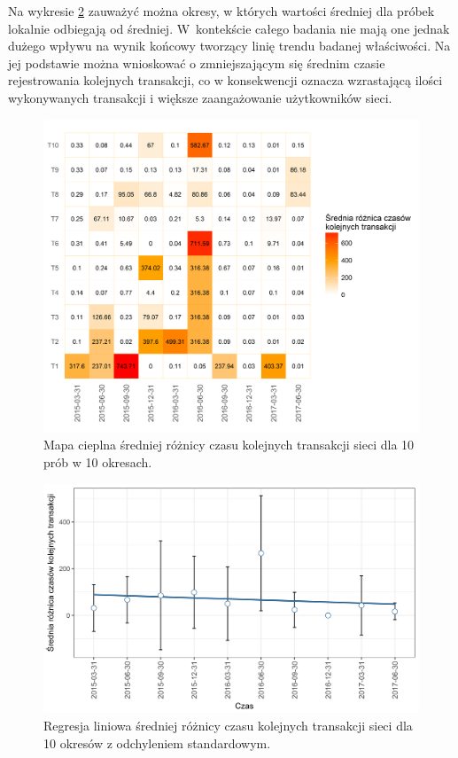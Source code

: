 \documentclass[12pt, twoside, final, openany]{mgr}
\newcommand{\chartsWidth}{0.8}
\begin{document}
\indent Na wykresie \ref{fig:rc2} zauważyć można okresy, w których wartości średniej dla próbek lokalnie odbiegają od średniej. W~kontekście całego badania nie mają one jednak dużego wpływu na wynik końcowy tworzący linię trendu badanej właściwości. Na jej podstawie można wnioskować o zmniejszającym się średnim czasie rejestrowania kolejnych transakcji, co w konsekwencji oznacza wzrastającą ilości wykonywanych transakcji i większe zaangażowanie użytkowników sieci. 
 
\begin{figure}[H]
\centering
   \includegraphics[width=\chartsWidth\linewidth]{pictures/roznica_czasow/roznica_czasow_hm.png}
   \caption{Mapa cieplna średniej różnicy czasu kolejnych transakcji sieci dla 10 prób w 10 okresach.}
   \label{fig:rc1} 
\end{figure}
\newpage
\begin{figure}[H]
\centering
   \includegraphics[width=\chartsWidth\linewidth]{pictures/roznica_czasow/roznica_czasow_sda.png}
   \caption{Regresja liniowa średniej różnicy czasu kolejnych transakcji sieci dla 10 okresów z odchyleniem standardowym.}
   \label{fig:rc2}
\end{figure}
\end{document}
